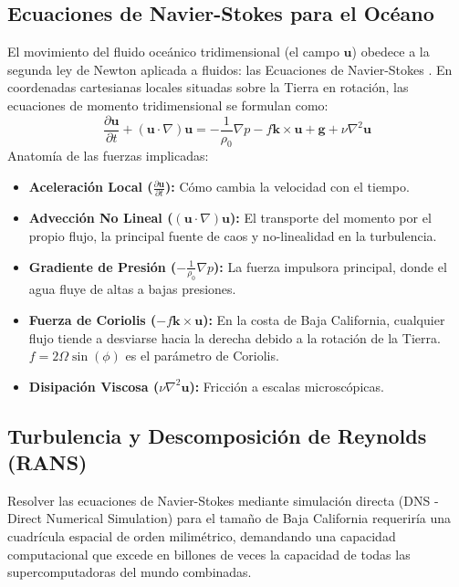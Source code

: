 \documentclass[11pt,a4paper]{article}
\begin{document}
\subsection{Ecuaciones de Navier-Stokes para el Océano}
El movimiento del fluido oceánico tridimensional (el campo $\mathbf{u}$) obedece a la segunda ley de Newton aplicada a fluidos: las Ecuaciones de Navier-Stokes \cite{talley2011}. En coordenadas cartesianas locales situadas sobre la Tierra en rotación, las ecuaciones de momento tridimensional se formulan como:
\begin{equation}
\frac{\partial \mathbf{u}}{\partial t} + (\mathbf{u} \cdot \nabla)\mathbf{u} = -\frac{1}{\rho_0}\nabla p - f\mathbf{k} \times \mathbf{u} + \mathbf{g} + \nu \nabla^2 \mathbf{u}
\end{equation}
Anatomía de las fuerzas implicadas:
\begin{itemize}
    \item \textbf{Aceleración Local ($\frac{\partial \mathbf{u}}{\partial t}$):} Cómo cambia la velocidad con el tiempo.
    \item \textbf{Advección No Lineal ($(\mathbf{u} \cdot \nabla)\mathbf{u}$):} El transporte del momento por el propio flujo, la principal fuente de caos y no-linealidad en la turbulencia.
    \item \textbf{Gradiente de Presión ($-\frac{1}{\rho_0}\nabla p$):} La fuerza impulsora principal, donde el agua fluye de altas a bajas presiones.
    \item \textbf{Fuerza de Coriolis ($-f\mathbf{k} \times \mathbf{u}$):} En la costa de Baja California, cualquier flujo tiende a desviarse hacia la derecha debido a la rotación de la Tierra. $f = 2\Omega \sin(\phi)$ es el parámetro de Coriolis.
    \item \textbf{Disipación Viscosa ($\nu \nabla^2 \mathbf{u}$):} Fricción a escalas microscópicas.
\end{itemize}

\subsection{Turbulencia y Descomposición de Reynolds (RANS)}
Resolver las ecuaciones de Navier-Stokes mediante simulación directa (DNS - Direct Numerical Simulation) para el tamaño de Baja California requeriría una cuadrícula espacial de orden milimétrico, demandando una capacidad computacional que excede en billones de veces la capacidad de todas las supercomputadoras del mundo combinadas. 
\end{document}
